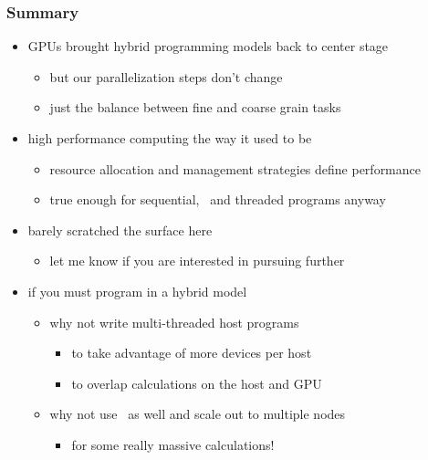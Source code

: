 \begin{frame}[fragile]
%
  \frametitle{Summary}
%
  \begin{itemize}
%
  \item GPUs brought hybrid programming models back to center stage
    \begin{itemize}
    \item but our parallelization steps don't change
    \item just the balance between fine and coarse grain tasks
    \end{itemize}
%
  \item high performance computing the way it used to be
    \begin{itemize}
    \item resource allocation and management strategies define performance
    \item true enough for sequential, \mpi\ and threaded programs anyway
    \end{itemize}
%
  \item barely scratched the surface here
    \begin{itemize}
    \item let me know if you are interested in pursuing further
    \end{itemize}
%
  \item if you must program in a hybrid model
    \begin{itemize}
    \item why not write multi-threaded host programs
      \begin{itemize}
      \item to take advantage of more devices per host
      \item to overlap calculations on the host and GPU
      \end{itemize}
    \item why not use \mpi\ as well and scale out to multiple nodes
      \begin{itemize}
      \item for some really massive calculations!
      \end{itemize}
    \end{itemize}
%
  \end{itemize}
%
\end{frame}

